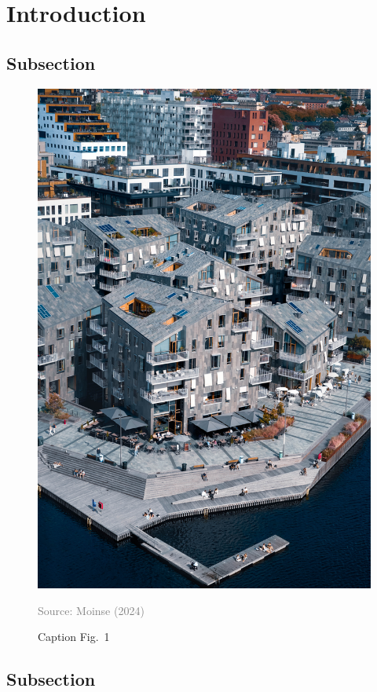 \documentclass[../main.tex]{subfiles}
\begin{document}
\section{Introduction}
    \label{section:introduction}

\lipsum[1-3]

\autocite{elit2022adaptive}

\subsection{Subsection}
    \label{subsection:1.1}

\lipsum[1-3]

\autocite{lorem2020exploring}

    \begin{figure}[h!] %
    \centering
\includegraphics[width=\columnwidth]{fig/fig-1.jpg}
\caption{Caption Fig.~1}
    \label{fig:1}
    \begin{flushright}
    \begin{minipage}{1\linewidth}
        \justifying
        \noindent
\tiny{\textcolor{gray}{Source: Moinse (2024)}}
        \end{minipage}
    \end{flushright}
    \end{figure}

\subsection{Subsection}
    \label{subsection:1.2}

\autocite{dolor2021impact}

\lipsum[1-3]

    
\end{document}
